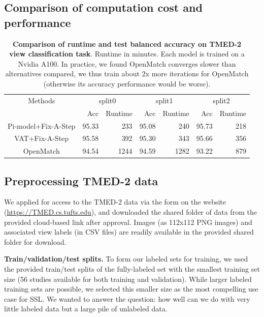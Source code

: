 \subsection{Comparison of computation cost and performance}
\setlength{\tabcolsep}{.3cm}
\begin{table}[!h]
\centering
\begin{tabular}{c | r r | r  r | r  r }
\multicolumn{0}{c}{Methods} &\multicolumn{2}{c}{split0} &\multicolumn{2}{c}{split1} &\multicolumn{2}{c}{split2}\\

& Acc & Runtime & Acc & Runtime & Acc & Runtime 
 \\ \hline
Pi-model+Fix-A-Step & 95.33 & 233 & 95.08 & 240 & 95.73 & 218\\
VAT+Fix-A-Step & 95.58 & 392& 95.30 & 343 & 95.66 & 356\\
OpenMatch & 94.54 & 1244& 94.59 & 1282 & 93.22 & 879\\

\end{tabular}
    \caption{
    \textbf{Comparison of runtime and test balanced accuracy on TMED-2 view classification task}. Runtime in minutes. Each model is trained on a Nvidia A100. In practice, we found OpenMatch converges slower than alternatives compared, we thus train about 2x more iterations for OpenMatch (otherwise its accuracy performance would be worse).
    }%
    \label{tab:TMED2_runtime_acc}
\end{table}

\subsection{Preprocessing TMED-2 data}

We applied for access to the TMED-2 data via the form on the website (\url{https://TMED.cs.tufts.edu}), and downloaded the shared folder of data from the provided cloud-based link after approval.
Images (as 112x112 PNG images) and associated view labels (in CSV files) are readily available in the provided shared folder for download.

\textbf{Train/validation/test splits.}
To form our labeled sets for training, we used the provided train/test splits of the fully-labeled set with the smallest training set size (56 studies available for both training and validation).
While larger labeled training sets are possible, we selected this smaller size as the most compelling use case for SSL.
We wanted to answer the question: how well can we do with very little labeled data but a large pile of unlabeled data.

